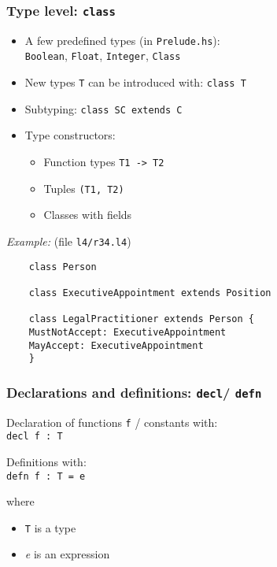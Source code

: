\documentclass{beamer}
\begin{document}
\begin{frame}[fragile]\frametitle{Type level: \texttt{class}}

  \begin{itemize}
  \item A few predefined types (in \texttt{Prelude.hs}):\\
    \texttt{Boolean}, \texttt{Float}, \texttt{Integer}, \texttt{Class}
  \item New types \texttt{T} can be introduced with: \texttt{class T}
  \item Subtyping: \texttt{class SC extends C}
  \item Type constructors:
    \begin{itemize}
    \item Function types \texttt{T1 -> T2}
    \item Tuples \texttt{(T1, T2)}
    \item Classes with fields
    \end{itemize}
  \end{itemize}

  \emph{Example:} (file \texttt{l4/r34.l4})
\small
  \begin{verbatim}
    class Person

    class ExecutiveAppointment extends Position

    class LegalPractitioner extends Person {
    MustNotAccept: ExecutiveAppointment
    MayAccept: ExecutiveAppointment
    }
\end{verbatim}
\normalsize

\end{frame}

\begin{frame}[fragile]\frametitle{Declarations and definitions: \texttt{decl}/
  \texttt{defn}}

  Declaration of functions \texttt{f} / constants with:\\
  \texttt{decl f : T}

  Definitions with:\\
  \texttt{defn f : T = e}

  where
  \begin{itemize}
  \item \texttt{T} is a type
  \item \emph{e} is an expression
  \end{itemize}
\end{frame}
\end{document}
